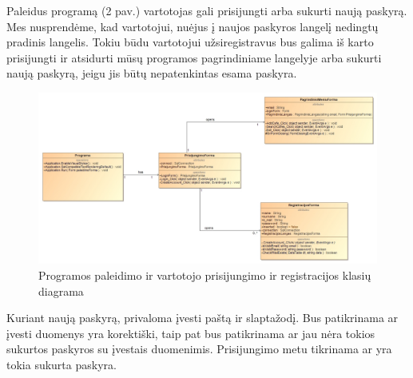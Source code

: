 \documentclass{VUMIFPSkursinis}
\begin{document}
{{{{{Paleidus programą (2 pav.) vartotojas gali prisijungti arba sukurti naują paskyrą. Mes nusprendėme, kad vartotojui, nuėjus į naujos paskyros langelį nedingtų pradinis langelis. Tokiu būdu vartotojui užsiregistravus bus galima iš karto prisijungti ir atsidurti mūsų programos pagrindiniame langelyje arba sukurti naują paskyrą, jeigu jis būtų nepatenkintas esama paskyra. 
\newline
\newline
\newline
\newline
\newline
\newline
\begin{figure}[H]
    \centering
    \includegraphics[width=\textwidth,height=\textheight,keepaspectratio]{img/Program_LoginForm_Register_MainMenu} 
    \caption{Programos paleidimo ir vartotojo prisijungimo ir registracijos  klasių diagrama}
    \label{img:Program_LoginForm_Register_MainMenu}
\end{figure}

Kuriant naują paskyrą, privaloma įvesti paštą ir slaptažodį. Bus patikrinama ar įvesti duomenys yra korektiški, taip pat bus patikrinama ar jau nėra tokios sukurtos paskyros su įvestais duomenimis. Prisijungimo metu tikrinama ar yra tokia sukurta paskyra.

}}}}}
\end{document}
